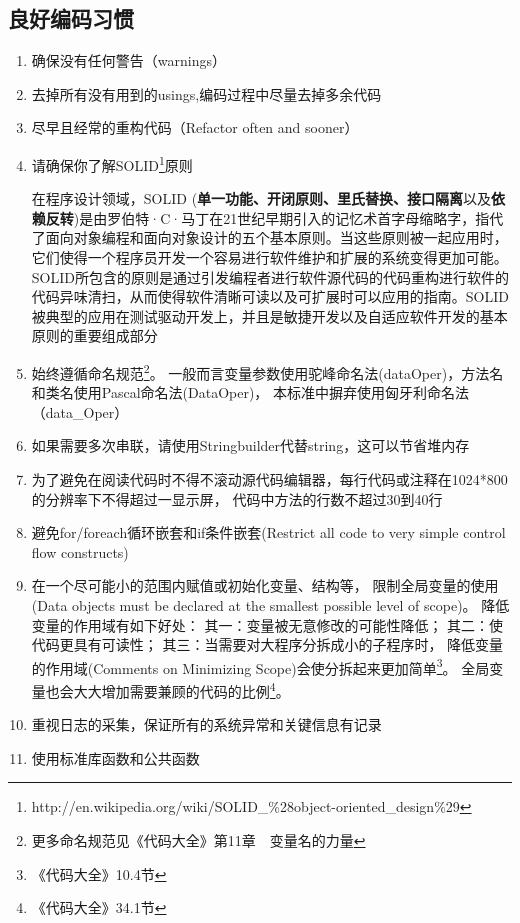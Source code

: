 \documentclass{book}
\begin{document}
\subsection{良好编码习惯}

\begin{enumerate}
\setcounter{enumi}{0}
\item{确保没有任何警告（warnings）}
\item{去掉所有没有用到的usings,编码过程中尽量去掉多余代码}
\item{尽早且经常的重构代码（Refactor often and sooner）}
\item{请确保你了解SOLID\footnote{http://en.wikipedia.org/wiki/SOLID\_\%28object-oriented\_design\%29}原则}

在程序设计领域，SOLID (\textbf{单一功能、开闭原则、里氏替换、接口隔离}以及\textbf{依赖反转})是由罗伯特·C·马丁在21世纪早期引入的记忆术首字母缩略字，指代了面向对象编程和面向对象设计的五个基本原则。当这些原则被一起应用时，它们使得一个程序员开发一个容易进行软件维护和扩展的系统变得更加可能。SOLID所包含的原则是通过引发编程者进行软件源代码的代码重构进行软件的代码异味清扫，从而使得软件清晰可读以及可扩展时可以应用的指南。SOLID被典型的应用在测试驱动开发上，并且是敏捷开发以及自适应软件开发的基本原则的重要组成部分
\item{始终遵循命名规范\footnote{更多命名规范见《代码大全》第11章~~变量名的力量}。
一般而言变量参数使用驼峰命名法(dataOper)，方法名和类名使用Pascal命名法(DataOper)，
本标准中摒弃使用匈牙利命名法（data\_Oper）}
\item{如果需要多次串联，请使用Stringbuilder代替string，这可以节省堆内存}
\item{为了避免在阅读代码时不得不滚动源代码编辑器，每行代码或注释在1024*800的分辨率下不得超过一显示屏，
代码中方法的行数不超过30到40行}
\item{避免for/foreach循环嵌套和if条件嵌套(Restrict all code to very simple control flow constructs)}
\item{在一个尽可能小的范围内赋值或初始化变量、结构等，
限制全局变量的使用(Data objects must be declared at the smallest possible level of scope)。
降低变量的作用域有如下好处：
其一：变量被无意修改的可能性降低；
其二：使代码更具有可读性；
其三：当需要对大程序分拆成小的子程序时，
降低变量的作用域(Comments on Minimizing Scope)会使分拆起来更加简单\footnote{《代码大全》10.4节}。
全局变量也会大大增加需要兼顾的代码的比例\footnote{《代码大全》34.1节}。}
\item{重视日志的采集，保证所有的系统异常和关键信息有记录}	
\item{使用标准库函数和公共函数}	

\end{enumerate}
\end{document}

